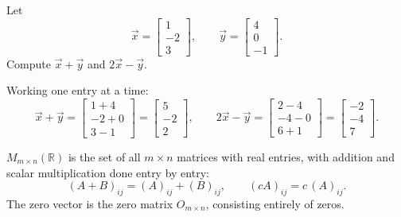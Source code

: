 \begin{example}
Let
\[
\vec{x} = \begin{bmatrix} 1 \\ -2 \\ 3 \end{bmatrix}, \qquad \vec{y} = \begin{bmatrix} 4 \\ 0 \\ -1 \end{bmatrix}.
\]
Compute $\vec{x} + \vec{y}$ and $2\vec{x} - \vec{y}$.

\begin{solution}
Working one entry at a time:
\[
\vec{x} + \vec{y} = \begin{bmatrix} 1 + 4 \\ -2 + 0 \\ 3 - 1 \end{bmatrix} = \begin{bmatrix} 5 \\ -2 \\ 2 \end{bmatrix},
\qquad
2\vec{x} - \vec{y} = \begin{bmatrix} 2 - 4 \\ -4 - 0 \\ 6 + 1 \end{bmatrix} = \begin{bmatrix} -2 \\ -4 \\ 7 \end{bmatrix}.
\]
\end{solution}
\end{example}

\begin{definition}
$M_{m \times n}(\mathbb{R})$ is the set of all $m \times n$ matrices with real entries, with addition and scalar multiplication done entry by entry:
\[
(A + B)_{ij} = (A)_{ij} + (B)_{ij}, \qquad (cA)_{ij} = c\,(A)_{ij}.
\]
The zero vector is the zero matrix $O_{m \times n}$, consisting entirely of zeros.
\end{definition}

